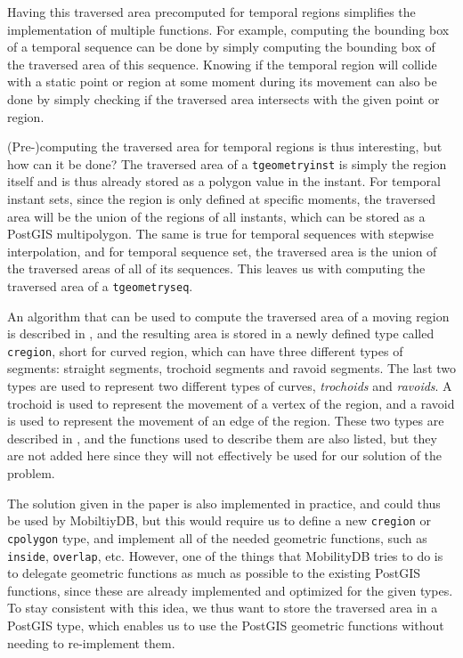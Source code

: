 Having this traversed area precomputed for temporal regions simplifies the implementation of multiple functions. For example, computing the bounding box of a temporal sequence can be done by simply computing the bounding box of the traversed area of this sequence. Knowing if the temporal region will collide with a static point or region at some moment during its movement can also be done by simply checking if the traversed area intersects with the given point or region.

(Pre-)computing the traversed area for temporal regions is thus interesting, but how can it be done? The traversed area of a \lstinline+tgeometryinst+ is simply the region itself and is thus already stored as a polygon value in the instant. For temporal instant sets, since the region is only defined at specific moments, the traversed area will be the union of the regions of all instants, which can be stored as a PostGIS multipolygon. The same is true for temporal sequences with stepwise interpolation, and for temporal sequence set, the traversed area is the union of the traversed areas of all of its sequences. This leaves us with computing the traversed area of a \lstinline+tgeometryseq+.

An algorithm that can be used to compute the traversed area of a moving region is described in \cite{fmregion}, and the resulting area is stored in a newly defined type called \lstinline{cregion}, short for curved region, which can have three different types of segments: straight segments, trochoid segments and ravoid segments. The last two types are used to represent two different types of curves, \textit{trochoids} and \textit{ravoids}. A trochoid is used to represent the movement of a vertex of the region, and a ravoid is used to represent the movement of an edge of the region. These two types are described in \cite{fmregion}, and the functions used to describe them are also listed, but they are not added here since they will not effectively be used for our solution of the problem.

The solution given in the paper is also implemented in practice, and could thus be used by MobiltiyDB, but this would require us to define a new \lstinline{cregion} or \lstinline{cpolygon} type, and implement all of the needed geometric functions, such as \lstinline{inside}, \lstinline{overlap}, etc. However, one of the things that MobilityDB tries to do is to delegate geometric functions as much as possible to the existing PostGIS functions, since these are already implemented and optimized for the given types. To stay consistent with this idea, we thus want to store the traversed area in a PostGIS type, which enables us to use the PostGIS geometric functions without needing to re-implement them.


